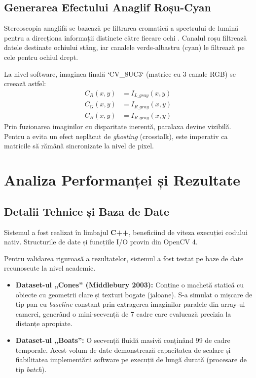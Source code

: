 \documentclass[12pt,a4paper]{report}
\begin{document}
\section{Generarea Efectului Anaglif Roșu-Cyan}
Stereoscopia anaglifă se bazează pe filtrarea cromatică a spectrului de lumină pentru a direcționa informații distincte către fiecare ochi \cite{woods2012understanding}. Canalul roșu filtrează datele destinate ochiului stâng, iar canalele verde-albastru (cyan) le filtrează pe cele pentru ochiul drept.

La nivel software, imaginea finală `CV\_8UC3` (matrice cu 3 canale RGB) se creează astfel:
\begin{align*}
    C_{R}(x, y) &= I_{L\_gray}(x, y) \\
    C_{G}(x, y) &= I_{R\_gray}(x, y) \\
    C_{B}(x, y) &= I_{R\_gray}(x, y)
\end{align*}
Prin fuzionarea imaginilor cu disparitate inerentă, paralaxa devine vizibilă. Pentru a evita un efect neplăcut de \textit{ghosting} (crosstalk), este imperativ ca matricile să rămână sincronizate la nivel de pixel.

\chapter{Analiza Performanței și Rezultate}

\section{Detalii Tehnice și Baza de Date}
Sistemul a fost realizat în limbajul \textbf{C++}, beneficiind de viteza execuției codului nativ. Structurile de date și funcțiile I/O provin din OpenCV 4.

Pentru validarea riguroasă a rezultatelor, sistemul a fost testat pe baze de date recunoscute la nivel academic.
\begin{itemize}
    \item \textbf{Dataset-ul „Cones” (Middlebury 2003):} Conține o machetă statică cu obiecte cu geometrii clare și texturi bogate (jaloane). S-a simulat o mișcare de tip pan cu \textit{baseline} constant prin extragerea imaginilor paralele din array-ul camerei, generând o mini-secvență de 7 cadre care evaluează precizia la distanțe apropiate.
    \item \textbf{Dataset-ul „Boats”:} O secvență fluidă masivă conținând 99 de cadre temporale. Acest volum de date demonstrează capacitatea de scalare și fiabilitatea implementării software pe execuții de lungă durată (procesare de tip \textit{batch}).
\end{itemize}
\end{document}
